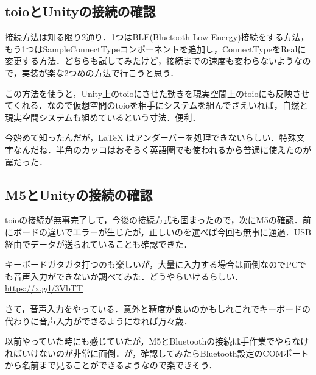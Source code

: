\documentclass[fleqn,twocolumn]{mynote}
\begin{document}
\subsection*{toioとUnityの接続の確認}
接続方法は知る限り2通り．1つはBLE(Bluetooth Low
Energy)接続をする方法，もう1つはSampleConnectTypeコンポーネントを追加し，ConnectTypeをRealに変更する方法．どちらも試してみたけど，接続までの速度も変わらないようなので，実装が楽な2つめの方法で行こうと思う．

  この方法を使うと，Unity上のtoioにさせた動きを現実空間上のtoioにも反映させてくれる．なので仮想空間のtoioを相手にシステムを組んでさえいれば，自然と現実空間システムも組めているという寸法．便利．

  今始めて知ったんだが，\LaTeX
  はアンダーバーを処理できないらしい．特殊文字なんだね．半角のカッコはおそらく英語圏でも使われるから普通に使えたのが罠だった．

  \subsection*{M5とUnityの接続の確認}
  toioの接続が無事完了して，今後の接続方式も固まったので，次にM5の確認．前にボードの違いでエラーが生じたが，正しいのを選べば今回も無事に通過．USB経由でデータが送られていることも確認できた．

  キーボードガタガタ打つのも楽しいが，大量に入力する場合は面倒なのでPCでも音声入力ができないか調べてみた．どうやらいけるらしい．\\
  \url{https://x.gd/3VbTT}

  さて，音声入力をやっている．意外と精度が良いのかもしれこれでキーボードの代わりに音声入力ができるようになれば万々歳．

  以前やっていた時にも感じていたが，M5とBluetoothの接続は手作業でやらなければいけないのが非常に面倒．が，確認してみたらBluetooth設定のCOMポートから名前まで見ることができるようなので楽できそう．
\end{document}
